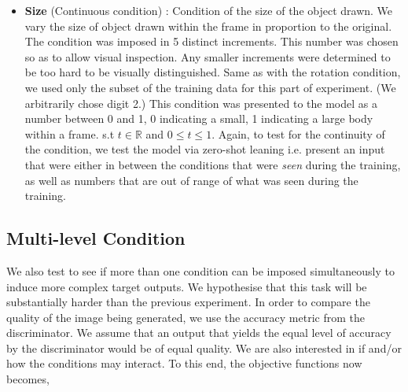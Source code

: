 \documentclass[11pt, letterpaper, oneside]{article}
\begin{document}
\begin{itemize}
    \item \textbf{Size} (Continuous condition) : Condition of the size of the object drawn. We vary the size of object drawn within the frame in proportion to the original. \newline
    The condition was imposed in 5 distinct increments. This number was chosen so as to allow visual inspection. Any smaller increments were determined to be too hard to be visually distinguished. Same as with the rotation condition, we used only the subset of the training data for this part of experiment. (We arbitrarily chose digit 2.) This condition was presented to the model as a number between 0 and 1, 0 indicating a small, 1 indicating a large body within a frame. s.t $ t \in \mathbb{R}$ and  $ 0 \leq t \leq 1$. Again, to test for the continuity of the condition, we test the model via zero-shot leaning i.e. present an input that were either in between the conditions that were \textit{seen} during the training, as well as numbers that are out of range of what was seen during the training. 
\end{itemize}

\subsection{Multi-level Condition}
We also test to see if more than one condition can be imposed simultaneously to induce more complex target outputs. We hypothesise that this task will be substantially harder than the previous experiment. In order to compare the quality of the image being generated, we use the accuracy metric from the discriminator. We assume that an output that yields the equal level of accuracy by the discriminator would be of equal quality. We are also interested in if and/or how the conditions may interact. To this end, the objective functions now becomes,
\end{document}
